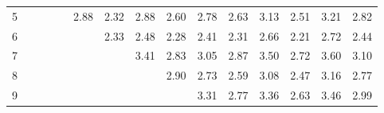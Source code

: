 \documentclass[a4paper, 11pt, ngerman]{article}
\theoremstyle{definition}
\theoremstyle{plain}
\theoremstyle{remark}
\begin{document}
\begin{figure}
\begin{tabular}{c|cccccccccccccc}
        5                    &                                  &                                  &                                  &                                  & \textcolor[HTML]{ 8c2072 }{2.88} & \textcolor[HTML]{ 62209c }{2.32} & \textcolor[HTML]{ 8c2072 }{2.88} & \textcolor[HTML]{ 772087 }{2.60} & \textcolor[HTML]{ 84207a }{2.78} & \textcolor[HTML]{ 7a2084 }{2.63} & \textcolor[HTML]{ 9f205f }{3.13} & \textcolor[HTML]{ 70208e }{2.51} & \textcolor[HTML]{ a52059 }{3.21} & \textcolor[HTML]{ 872077 }{2.82} \\
        6                    &                                  &                                  &                                  &                                  &                                  & \textcolor[HTML]{ 63209b }{2.33} & \textcolor[HTML]{ 6e2090 }{2.48} & \textcolor[HTML]{ 5f209f }{2.28} & \textcolor[HTML]{ 692095 }{2.41} & \textcolor[HTML]{ 61209d }{2.31} & \textcolor[HTML]{ 7c2082 }{2.66} & \textcolor[HTML]{ 5a20a4 }{2.21} & \textcolor[HTML]{ 80207e }{2.72} & \textcolor[HTML]{ 6b2093 }{2.44} \\
        7                    &                                  &                                  &                                  &                                  &                                  &                                  & \textcolor[HTML]{ b4204a }{3.41} & \textcolor[HTML]{ 882076 }{2.83} & \textcolor[HTML]{ 992065 }{3.05} & \textcolor[HTML]{ 8b2073 }{2.87} & \textcolor[HTML]{ ba2044 }{3.50} & \textcolor[HTML]{ 80207e }{2.72} & \textcolor[HTML]{ c2203c }{3.60} & \textcolor[HTML]{ 9c2062 }{3.10} \\
        8                    &                                  &                                  &                                  &                                  &                                  &                                  &                                  & \textcolor[HTML]{ 8d2071 }{2.90} & \textcolor[HTML]{ 81207d }{2.73} & \textcolor[HTML]{ 762088 }{2.59} & \textcolor[HTML]{ 9b2063 }{3.08} & \textcolor[HTML]{ 6d2091 }{2.47} & \textcolor[HTML]{ a1205d }{3.16} & \textcolor[HTML]{ 84207a }{2.77} \\
        9                    &                                  &                                  &                                  &                                  &                                  &                                  &                                  &                                  & \textcolor[HTML]{ ac2052 }{3.31} & \textcolor[HTML]{ 84207a }{2.77} & \textcolor[HTML]{ b0204e }{3.36} & \textcolor[HTML]{ 792085 }{2.63} & \textcolor[HTML]{ b72047 }{3.46} & \textcolor[HTML]{ 94206a }{2.99} \\

\end{tabular}
\end{figure}
\end{document}
